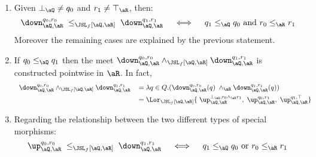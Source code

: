 \documentclass{article}
\begin{document}
\begin{lemma}
\begin{enumerate}
\item
Given $\bot_\aQ \neq q_0$ and $r_1 \neq \top_\aR$, then:
\[
\down_{\aQ,\aR}^{q_0,r_0} \; \leq_{\JSL_f[\aQ,\aR]} \; \down_{\aQ,\aR}^{q_1,r_1}
\quad\iff\quad
\text{$q_1 \leq_\aQ q_0$ and $r_0 \leq_\aR r_1$}
\]
Moreover the remaining cases are explained by the previous statement.

\item
If $q_0 \leq_\aQ q_1$ then the meet $\down_{\aQ,\aR}^{q_0,r_0} \land_{\JSL_f[\aQ,\aR]} \down_{\aQ,\aR}^{q_1,r_1}$ is constructed pointwise in $\aR$. In fact,
\[
\begin{tabular}{ll}
$\down_{\aQ,\aR}^{q_0,r_0} \land_{\JSL_f[\aQ,\aR]} \down_{\aQ,\aR}^{q_1,r_1}$
&
$= \lambda q \in Q.( \down_{\aQ,\aR}^{q_0,r_0}(q) \; \land_\aR \down_{\aQ,\aR}^{q_1,r_1}(q))$
\\[1ex]&
$= \Lor_{\JSL_f[\aQ,\aR]} \{ \; \up_{\aQ,\aR}^{\bot_\aQ,r_0 \land_\aR r_1}, \;  \up_{\aQ,\aR}^{q_0,r_1}, \; \up_{\aQ,\aR}^{q_1,\top}  \}$
\end{tabular}
\]

\item
Regarding the relationship between the two different types of special morphisms:
\[
\up_{\aQ,\aR}^{q_0,r_0} \; \leq_{\JSL_f[\aQ,\aR]} \; \down_{\aQ,\aR}^{q_1,r_1}
\quad\iff\quad
q_1 \leq_\aQ q_0 \text{ or } r_0 \leq_\aR r_1
\]


\end{enumerate}
\end{lemma}
\end{document}
